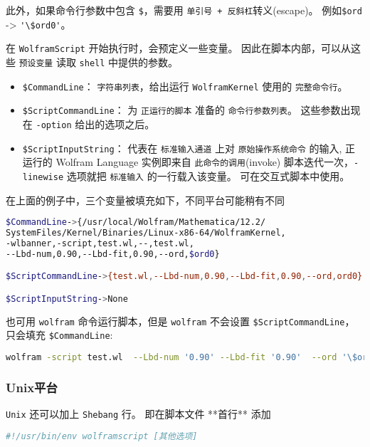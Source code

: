 此外，如果命令行参数中包含 \verb`$`，需要用 \verb`单引号 + 反斜杠`转义(escape)。
例如\verb`$ord` -> \verb`'\$ord0'`。

在 \verb`WolframScript` 开始执行时，会预定义一些变量。
因此在脚本内部，可以从这些 \verb`预设变量` 读取 \verb`shell` 中提供的参数。

\begin{itemize}
\item \verb`$CommandLine`： \verb`字符串列表`，给出运行 \verb`WolframKernel` 使用的 \verb`完整命令行`。
\item \verb`$ScriptCommandLine`： 为 \verb`正运行的脚本` 准备的 \verb`命令行参数列表`。
这些参数出现在 \verb`-option` 给出的选项之后。
\item \verb`$ScriptInputString`： 代表在 \verb`标准输入通道` 上对 \verb`原始操作系统命令` 的输入,
正运行的 Wolfram Language 实例即来自 \verb`此命令的调用`(invoke)
脚本迭代一次，\verb`-linewise` 选项就把 \verb`标准输入` 的一行载入该变量。
可在交互式脚本中使用。
\end{itemize}


在上面的例子中，三个变量被填充如下，不同平台可能稍有不同

\begin{lstlisting}[language=bash]
$CommandLine->{/usr/local/Wolfram/Mathematica/12.2/
SystemFiles/Kernel/Binaries/Linux-x86-64/WolframKernel,
-wlbanner,-script,test.wl,--,test.wl,
--Lbd-num,0.90,--Lbd-fit,0.90,--ord,$ord0}

$ScriptCommandLine->{test.wl,--Lbd-num,0.90,--Lbd-fit,0.90,--ord,ord0}

$ScriptInputString->None
\end{lstlisting}

也可用 \verb`wolfram` 命令运行脚本，但是 \verb`wolfram` 不会设置 \verb`$ScriptCommandLine`，只会填充 \verb`$CommandLine`:

\begin{lstlisting}[language=bash]
wolfram -script test.wl  --Lbd-num '0.90' --Lbd-fit '0.90'  --ord '\$ord0'
\end{lstlisting}

\subsubsection{Unix平台} 

\verb`Unix` 还可以加上 \verb`Shebang` 行。 即在脚本文件 **首行** 添加
\begin{lstlisting}[language=bash]
#!/usr/bin/env wolframscript [其他选项]
\end{lstlisting}

